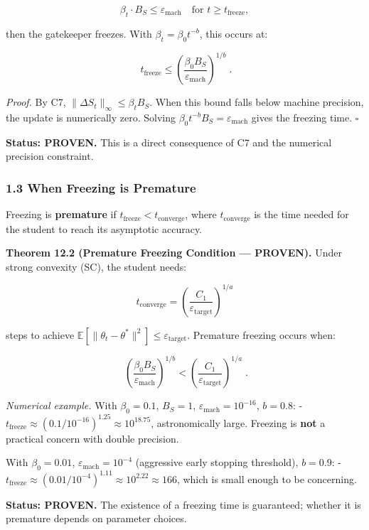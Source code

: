 \documentclass[
  12pt,
]{article}
\begin{document}
\[\beta_t \cdot B_S \leq \varepsilon_{\text{mach}} \quad \text{for } t \geq t_{\text{freeze}},\]

then the gatekeeper freezes. With \(\beta_t = \beta_0 t^{-b}\), this
occurs at:

\[\boxed{\;t_{\text{freeze}} \leq \left(\frac{\beta_0 B_S}{\varepsilon_{\text{mach}}}\right)^{1/b}\;}.\]

\emph{Proof.} By C7, \(\|\Delta S_t\|_\infty \leq \beta_t B_S\). When
this bound falls below machine precision, the update is numerically
zero. Solving \(\beta_0 t^{-b} B_S = \varepsilon_{\text{mach}}\) gives
the freezing time. \(\square\)

\textbf{Status: PROVEN.} This is a direct consequence of C7 and the
numerical precision constraint.

\subsubsection{1.3 When Freezing is
Premature}\label{when-freezing-is-premature}

Freezing is \textbf{premature} if
\(t_{\text{freeze}} < t_{\text{converge}}\), where
\(t_{\text{converge}}\) is the time needed for the student to reach its
asymptotic accuracy.

\textbf{Theorem 12.2 (Premature Freezing Condition --- PROVEN).} Under
strong convexity (SC), the student needs:

\[t_{\text{converge}} = \left(\frac{C_1}{\varepsilon_{\text{target}}}\right)^{1/a}\]

steps to achieve
\(\mathbb{E}[\|\theta_t - \theta^*\|^2] \leq \varepsilon_{\text{target}}\).
Premature freezing occurs when:

\[\boxed{\;\left(\frac{\beta_0 B_S}{\varepsilon_{\text{mach}}}\right)^{1/b} < \left(\frac{C_1}{\varepsilon_{\text{target}}}\right)^{1/a}\;}.\]

\emph{Numerical example.} With \(\beta_0 = 0.1\), \(B_S = 1\),
\(\varepsilon_{\text{mach}} = 10^{-16}\), \(b = 0.8\): -
\(t_{\text{freeze}} \approx (0.1 / 10^{-16})^{1.25} \approx 10^{18.75}\),
astronomically large. Freezing is \textbf{not} a practical concern with
double precision.

With \(\beta_0 = 0.01\), \(\varepsilon_{\text{mach}} = 10^{-4}\)
(aggressive early stopping threshold), \(b = 0.9\): -
\(t_{\text{freeze}} \approx (0.01 / 10^{-4})^{1.11} \approx 10^{2.22} \approx 166\),
which is small enough to be concerning.

\textbf{Status: PROVEN.} The existence of a freezing time is guaranteed;
whether it is premature depends on parameter choices.
\end{document}
